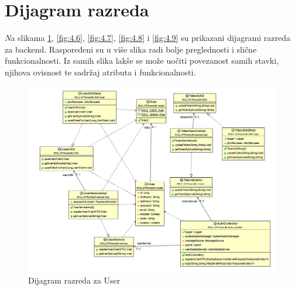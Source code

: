 			\eject
			
		\section{Dijagram razreda}
		
			\textit Na slikama  \ref{fig:4.5}, \ref{fig:4.6}, \ref{fig:4.7}, \ref{fig:4.8} i \ref{fig:4.9} su prikazani dijagrami razreda za backend. Raspoređeni su u više slika radi bolje preglednosti i slične funkcionalnosti. Iz samih slika lakše se može uočiti povezanost samih stavki, njihova ovisnost te sadržaj atributa i funkcionalnosti.
			\begin{figure}[H]
				\includegraphics[scale=0.65]{slike/user.png} %
				\centering
				\caption { Dijagram razreda za User}
				\label{fig:4.5}
			\end{figure}
		
